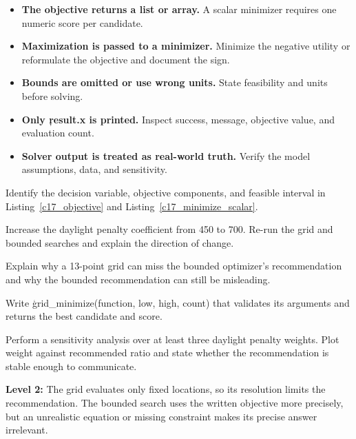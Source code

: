 
\begin{itemize}
    \item \textbf{The objective returns a list or array.} A scalar minimizer
          requires one numeric score per candidate.
    \item \textbf{Maximization is passed to a minimizer.} Minimize the negative
          utility or reformulate the objective and document the sign.
    \item \textbf{Bounds are omitted or use wrong units.} State feasibility and
          units before solving.
    \item \textbf{Only \c{result.x} is printed.} Inspect success, message,
          objective value, and evaluation count.
    \item \textbf{Solver output is treated as real-world truth.} Verify the
          model assumptions, data, and sensitivity.
\end{itemize}



Identify the decision variable, objective components, and feasible interval in
Listing~\ref{c17_objective} and Listing~\ref{c17_minimize_scalar}.


Increase the daylight penalty coefficient from 450 to 700. Re-run the grid and
bounded searches and explain the direction of change.


Explain why a 13-point grid can miss the bounded optimizer's recommendation and
why the bounded recommendation can still be misleading.


Write \c{grid_minimize(function, low, high, count)} that validates its arguments
and returns the best candidate and score.


Perform a sensitivity analysis over at least three daylight penalty weights.
Plot weight against recommended ratio and state whether the recommendation is
stable enough to communicate.


\textbf{Level 2:} The grid evaluates only fixed locations, so its resolution
limits the recommendation. The bounded search uses the written objective more
precisely, but an unrealistic equation or missing constraint makes its precise
answer irrelevant.

